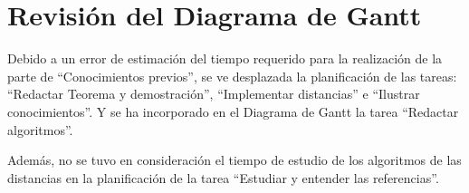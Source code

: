 \documentclass[a4paper, 12pt]{article}
\begin{document}
\section{Revisión del Diagrama de Gantt}
Debido a un error de estimación del tiempo requerido para la realización de la parte de ``Conocimientos previos'', se ve desplazada la planificación de las tareas: ``Redactar Teorema y demostración'', ``Implementar distancias'' e ``Ilustrar conocimientos''. Y se ha incorporado en el Diagrama de Gantt la tarea ``Redactar algoritmos''.

Además, no se tuvo en consideración el tiempo de estudio de los algoritmos de las distancias en la planificación de la tarea ``Estudiar y entender las referencias''.




\end{document}
